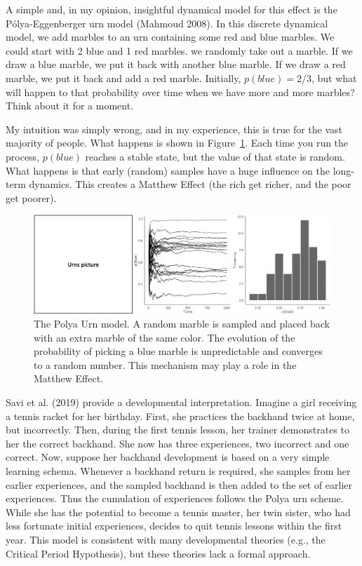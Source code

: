 \documentclass[
  a4paper,
  DIV=11,
  numbers=noendperiod,
  oneside]{scrreprt}
\begin{document}
A simple and, in my opinion, insightful dynamical model for this effect
is the Pólya-Eggenberger urn model (Mahmoud 2008). In this discrete
dynamical model, we add marbles to an urn containing some red and blue
marbles. We could start with 2 blue and 1 red marbles. we randomly take
out a marble. If we draw a blue marble, we put it back with another blue
marble. If we draw a red marble, we put it back and add a red marble.
Initially, \(p(blue) = 2/3\), but what will happen to that probability
over time when we have more and more marbles? Think about it for a
moment.

My intuition was simply wrong, and in my experience, this is true for
the vast majority of people. What happens is shown in
Figure~\ref{fig-ch4n-img12-old-60}. Each time you run the process,
\(p(blue)\) reaches a stable state, but the value of that state is
random. What happens is that early (random) samples have a huge
influence on the long-term dynamics. This creates a Matthew Effect (the
rich get richer, and the poor get poorer).

\begin{figure}

{\centering \includegraphics{media/ch4n/fig-ch4n-img12-old-60.png}

}

\caption{\label{fig-ch4n-img12-old-60}The Polya Urn model. A random
marble is sampled and placed back with an extra marble of the same
color. The evolution of the probability of picking a blue marble is
unpredictable and converges to a random number. This mechanism may play
a role in the Matthew Effect.}

\end{figure}

Savi et al. (2019) provide a developmental interpretation. Imagine a
girl receiving a tennis racket for her birthday. First, she practices
the backhand twice at home, but incorrectly. Then, during the first
tennis lesson, her trainer demonstrates to her the correct backhand. She
now has three experiences, two incorrect and one correct. Now, suppose
her backhand development is based on a very simple learning schema.
Whenever a backhand return is required, she samples from her earlier
experiences, and the sampled backhand is then added to the set of
earlier experiences. Thus the cumulation of experiences follows the
Polya urn scheme. While she has the potential to become a tennis master,
her twin sister, who had less fortunate initial experiences, decides to
quit tennis lessons within the first year. This model is consistent with
many developmental theories (e.g., the Critical Period Hypothesis), but
these theories lack a formal approach.
\end{document}
